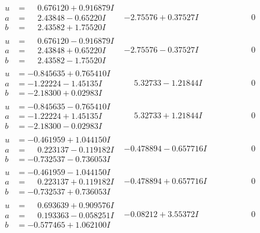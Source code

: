 \documentclass[1p]{elsarticle_modified}
\theoremstyle{definition}
\begin{document}
$$\begin{array}{c|c|c}
\begin{aligned}
u &= \phantom{-}0.676120 + 0.916879 I \\
a &= \phantom{-}2.43848 - 0.65220 I \\
b &= \phantom{-}2.43582 + 1.75520 I\end{aligned}
 & -2.75576 + 0.37527 I & \phantom{-0.000000 } 0 \\ \hline\begin{aligned}
u &= \phantom{-}0.676120 - 0.916879 I \\
a &= \phantom{-}2.43848 + 0.65220 I \\
b &= \phantom{-}2.43582 - 1.75520 I\end{aligned}
 & -2.75576 - 0.37527 I & \phantom{-0.000000 } 0 \\ \hline\begin{aligned}
u &= -0.845635 + 0.765410 I \\
a &= -1.22224 - 1.45135 I \\
b &= -2.18300 + 0.02983 I\end{aligned}
 & \phantom{-}5.32733 - 1.21844 I & \phantom{-0.000000 } 0 \\ \hline\begin{aligned}
u &= -0.845635 - 0.765410 I \\
a &= -1.22224 + 1.45135 I \\
b &= -2.18300 - 0.02983 I\end{aligned}
 & \phantom{-}5.32733 + 1.21844 I & \phantom{-0.000000 } 0 \\ \hline\begin{aligned}
u &= -0.461959 + 1.044150 I \\
a &= \phantom{-}0.223137 - 0.119182 I \\
b &= -0.732537 - 0.736053 I\end{aligned}
 & -0.478894 - 0.657716 I & \phantom{-0.000000 } 0 \\ \hline\begin{aligned}
u &= -0.461959 - 1.044150 I \\
a &= \phantom{-}0.223137 + 0.119182 I \\
b &= -0.732537 + 0.736053 I\end{aligned}
 & -0.478894 + 0.657716 I & \phantom{-0.000000 } 0 \\ \hline\begin{aligned}
u &= \phantom{-}0.693639 + 0.909576 I \\
a &= \phantom{-}0.193363 - 0.058251 I \\
b &= -0.577465 + 1.062100 I\end{aligned}
 & -0.08212 + 3.55372 I & \phantom{-0.000000 } 0 \\ \hline\begin{aligned}

\end{aligned}
\end{array}$$
\end{document}
